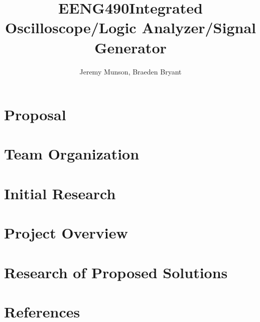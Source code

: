 \documentclass[11pt]{article}
\title{EENG490\linebreak \linebreak Integrated Oscilloscope/Logic Analyzer/Signal Generator}
\author{Jeremy Munson, Braeden Bryant}
\begin{document}
	
	
	
	

	\section{Proposal}
	
	
	
	
	
	

	\section{Team Organization}
	
	

	\section{Initial Research}
	
	

	\section{Project Overview}
	
	
	
	
	

	\section{Research of Proposed Solutions}
	
	
	
	
	
	
	
	
	
	\section{References}
\end{document}
